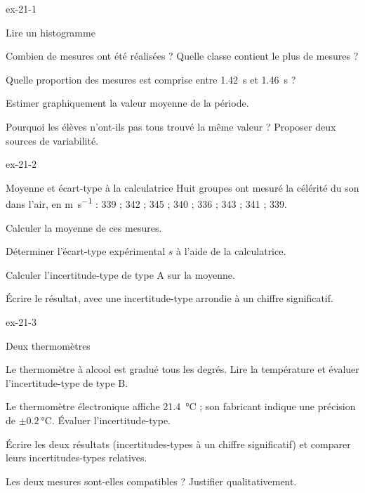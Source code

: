 \begin{blocLivre}{ex-21-1}
\begin{exercice}[1]{Lire un histogramme}
\begin{questions}
\item Combien de mesures ont été réalisées ? Quelle classe contient le plus de mesures ?
\item Quelle proportion des mesures est comprise entre \qty{1,42}{s} et \qty{1,46}{s} ?
\item Estimer graphiquement la valeur moyenne de la période.
\item Pourquoi les élèves n'ont-ils pas tous trouvé la même valeur ? Proposer deux sources de variabilité.
\end{questions}
\end{exercice}
\end{blocLivre}
\begin{blocLivre}{ex-21-2}
\begin{exercice}[1]{Moyenne et écart-type à la calculatrice}
Huit groupes ont mesuré la célérité du son dans l'air, en \unit{m.s^{-1}} : 339 ; 342 ; 345 ; 340 ; 336 ; 343 ; 341 ; 339.
\begin{questions}
\item Calculer la moyenne de ces mesures.
\item Déterminer l'écart-type expérimental $s$ à l'aide de la calculatrice.
\item Calculer l'incertitude-type de type A sur la moyenne.
\item Écrire le résultat, avec une incertitude-type arrondie à un chiffre significatif.
\end{questions}
\end{exercice}
\end{blocLivre}
\begin{blocLivre}{ex-21-3}
\begin{exercice}[1]{Deux thermomètres}
\begin{questions}
\item Le thermomètre à alcool est gradué tous les degrés. Lire la température et évaluer l'incertitude-type de type B.
\item Le thermomètre électronique affiche \qty{21,4}{\degreeCelsius} ; son fabricant indique une précision de $\pm\qty{0,2}{\degreeCelsius}$. Évaluer l'incertitude-type.
\item Écrire les deux résultats (incertitudes-types à un chiffre significatif) et comparer leurs incertitudes-types relatives.
\item Les deux mesures sont-elles compatibles ? Justifier qualitativement.
\end{questions}
\end{exercice}
\end{blocLivre}
